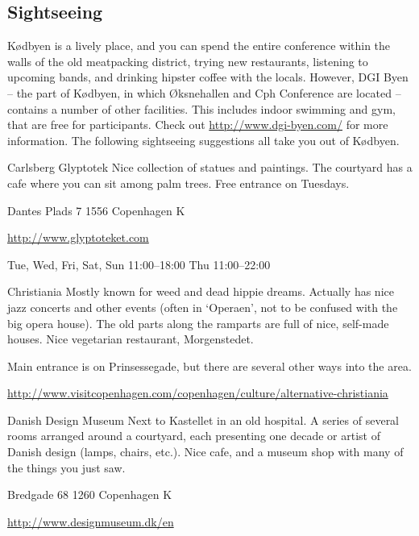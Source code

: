 \begin{left}
\section{Sightseeing}
Kødbyen is a lively place, and you can spend the entire conference within the walls of the old meatpacking district, trying new restaurants, listening to upcoming bands, and drinking hipster coffee with the locals. However, DGI Byen – the part of Kødbyen, in which Øksnehallen and Cph Conference are located – contains a number of other facilities. This includes indoor swimming and gym, that are free for participants. Check out \url{http://www.dgi-byen.com/} for more information. The following sightseeing suggestions all take you out of Kødbyen.
\par
\bigskip
\begin{funitem}
{Carlsberg Glyptotek}
{Nice collection of statues and paintings. The courtyard has a cafe where you can sit among palm trees. Free entrance on Tuesdays.}
{\begin{addr}
{Dantes Plads 7}
{1556 Copenhagen K}
\end{addr}}
{\url{http://www.glyptoteket.com}}
{\begin{ohours}
{Tue, Wed, Fri, Sat, Sun}
{11:00–18:00}
{Thu}
{11:00–22:00}
{}
{}
{}
{}
\end{ohours}}
\end{funitem}
\begin{funitemshortaddr}
{Christiania}
{Mostly known for weed and dead hippie dreams. Actually has nice jazz concerts and other events (often in ‘Operaen’, not to be confused with the big opera house). The old parts along the ramparts are full of nice, self-made houses. Nice vegetarian restaurant, Morgenstedet. }
{\begin{shortaddr}
{Main entrance is on Prinsessegade, but there are several other ways into the area.}
\end{shortaddr}}
{\url{http://www.visitcopenhagen.com/copenhagen/culture/alternative-christiania }}
\end{funitemshortaddr}
\begin{funitem}
{Danish Design Museum}
{Next to Kastellet in an old hospital. A series of several rooms arranged around a courtyard, each presenting one decade or artist of Danish design (lamps, chairs, etc.). Nice cafe, and a museum shop with many of the things you just saw.}
{\begin{addr}
{Bredgade 68}
{1260 Copenhagen K}
\end{addr}}
{\url{http://www.designmuseum.dk/en}}

\end{funitem}
\end{left}
